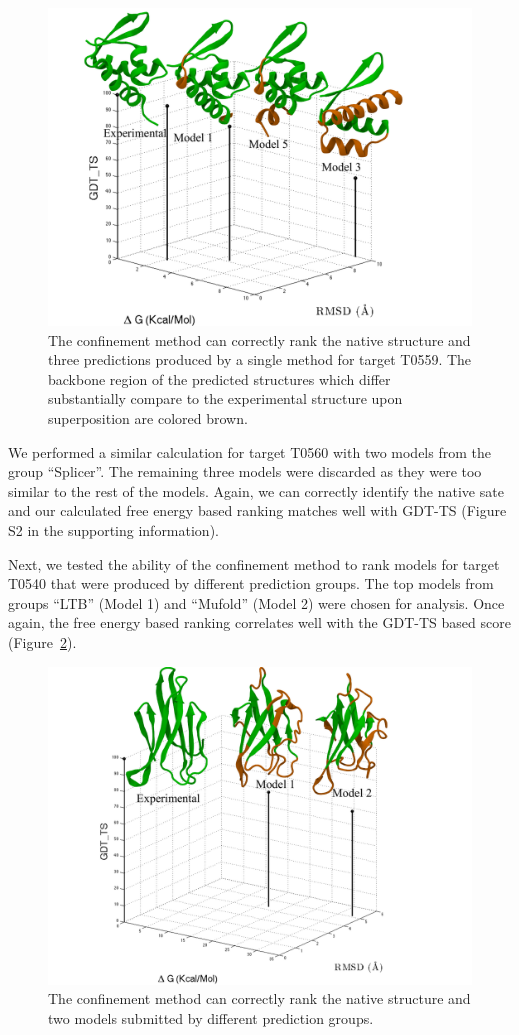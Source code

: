 \documentclass[12pt]{article}
\begin{document}
\begin{figure}
    \begin{center}
        \includegraphics[width=3.8 in]{T0559.pdf}
    \end{center}
    \caption{The confinement method can correctly rank the native structure and three predictions produced by a single
        method for target T0559. The backbone region of the predicted structures which differ substantially compare to the
        experimental structure upon superposition are colored brown.}
\label{fig:T0559}
\end{figure}

We performed a similar calculation for target T0560 with two models from the group ``Splicer''. The remaining three
models were discarded as they were too similar to the rest of the models. Again, we can correctly identify the native
sate and our calculated free energy based ranking matches well with GDT-TS (Figure S2 in the supporting information).

Next, we tested the ability of the confinement method to rank models for target T0540 that were produced by different
prediction groups. The top models from groups ``LTB'' (Model 1) and ``Mufold'' (Model 2) were chosen for analysis. Once
again, the free energy based ranking correlates well with the GDT-TS based score (Figure~\ref{fig:T0540}).

\begin{figure}
    \begin{center}
        \includegraphics[width=3.5 in]{T0540.pdf}
    \end{center}
    \caption{The confinement method can correctly rank the native structure and two models submitted by different
        prediction groups.}
\label{fig:T0540}
\end{figure}
\end{document}
